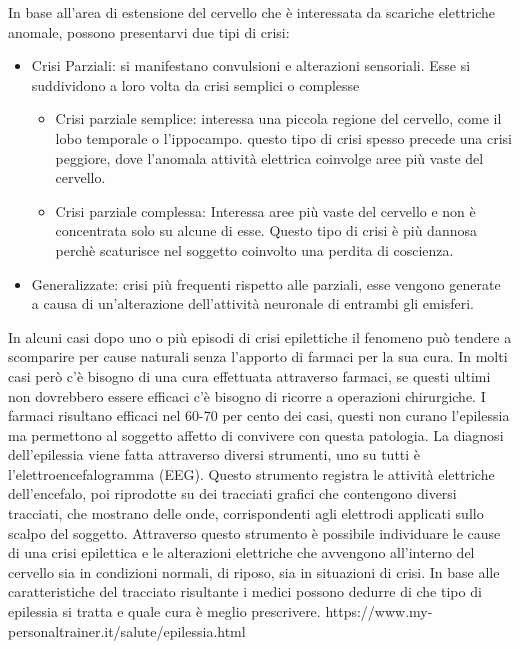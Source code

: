 \documentclass{article}
\begin{document}
In base all'area di estensione del cervello che è interessata da scariche elettriche anomale, possono presentarvi due tipi di crisi:
\begin{itemize}
\item Crisi Parziali:  si manifestano convulsioni e alterazioni sensoriali. Esse si suddividono a loro volta da crisi semplici o complesse 
\begin{itemize}
\item Crisi parziale semplice: interessa una piccola regione del cervello, come il lobo temporale o l'ippocampo. questo tipo di crisi spesso precede una crisi peggiore, dove l'anomala attività elettrica coinvolge aree più vaste del cervello.
\item Crisi parziale complessa: Interessa aree più vaste del cervello e non è concentrata solo su alcune di esse. Questo tipo di crisi è più dannosa perchè scaturisce nel soggetto coinvolto una perdita di coscienza.
\end{itemize}
\item Generalizzate: crisi più frequenti rispetto alle parziali, esse vengono generate a causa di un'alterazione dell'attività neuronale di  entrambi gli emisferi.
\end{itemize}
 In alcuni casi dopo uno o più episodi di crisi epilettiche il fenomeno può tendere a scomparire per cause naturali senza l'apporto di farmaci per la sua cura. In molti casi però c'è bisogno di una cura effettuata attraverso farmaci, se questi ultimi non dovrebbero essere efficaci c'è bisogno di ricorre a operazioni chirurgiche.
I farmaci risultano efficaci nel 60-70 per cento dei casi, questi non curano l'epilessia ma permettono al soggetto affetto di convivere con questa patologia.
 La diagnosi dell'epilessia viene fatta attraverso diversi strumenti, uno su tutti è l'elettroencefalogramma (EEG). Questo strumento registra le attività elettriche dell'encefalo, poi riprodotte su dei tracciati grafici che contengono diversi tracciati,  che mostrano delle onde, corrispondenti agli elettrodi applicati sullo scalpo del soggetto.
 Attraverso questo strumento è possibile individuare le cause di una crisi epilettica e le alterazioni  elettriche che avvengono all'interno del cervello sia in condizioni normali, di riposo, sia in situazioni di crisi. In base alle caratteristiche del tracciato risultante i medici possono dedurre di che tipo di epilessia si tratta e quale cura è meglio prescrivere. 
https://www.my-personaltrainer.it/salute/epilessia.html
\end{document}
